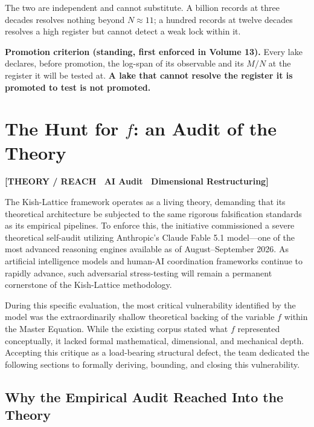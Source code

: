 \documentclass[11pt, letterpaper, openany]{book}
\newcommand{\MN}{M/N}
\begin{document}
The two are independent and cannot substitute. A billion records at three decades resolves
nothing beyond $N \approx 11$; a hundred records at twelve decades resolves a high register but
cannot detect a weak lock within it. 

\begin{predictionbox}
\textbf{Promotion criterion (standing, first enforced in Volume 13).} Every lake declares, before
promotion, the log-span of its observable and its $\MN$ at the register it will be tested at. \textbf{A lake that cannot resolve the register it is
promoted to test is not promoted.}
\end{predictionbox}

\chapter{The Hunt for $f$: an Audit of the Theory}

\begin{center}
{\color{theorytag}\textbf{[THEORY / REACH \textbullet\ AI Audit \textbullet\ Dimensional Restructuring]}}
\end{center}

The Kish-Lattice framework operates as a living theory, demanding that its theoretical architecture be subjected to the same rigorous falsification standards as its empirical pipelines. To enforce this, the initiative commissioned a severe theoretical self-audit utilizing Anthropic's Claude Fable 5.1 model—one of the most advanced reasoning engines available as of August--September 2026. As artificial intelligence models and human-AI coordination frameworks continue to rapidly advance, such adversarial stress-testing will remain a permanent cornerstone of the Kish-Lattice methodology. 

During this specific evaluation, the most critical vulnerability identified by the model was the extraordinarily shallow theoretical backing of the variable $f$ within the Master Equation. While the existing corpus stated what $f$ represented conceptually, it lacked formal mathematical, dimensional, and mechanical depth. Accepting this critique as a load-bearing structural defect, the team dedicated the following sections to formally deriving, bounding, and closing this vulnerability.

\section{Why the Empirical Audit Reached Into the Theory}
\end{document}
